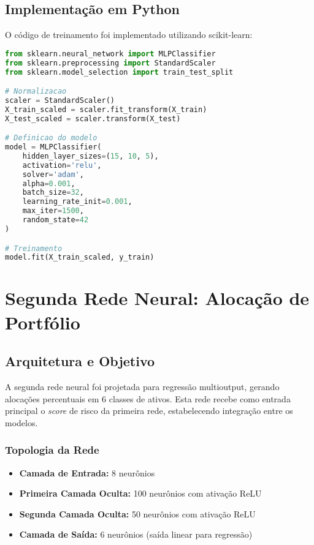 \subsection{Implementação em Python}

O código de treinamento foi implementado utilizando scikit-learn:

\begin{lstlisting}[language=Python, caption=Implementação da primeira rede neural, label=lst:rede1]
from sklearn.neural_network import MLPClassifier
from sklearn.preprocessing import StandardScaler
from sklearn.model_selection import train_test_split

# Normalizacao
scaler = StandardScaler()
X_train_scaled = scaler.fit_transform(X_train)
X_test_scaled = scaler.transform(X_test)

# Definicao do modelo
model = MLPClassifier(
    hidden_layer_sizes=(15, 10, 5),
    activation='relu',
    solver='adam',
    alpha=0.001,
    batch_size=32,
    learning_rate_init=0.001,
    max_iter=1500,
    random_state=42
)

# Treinamento
model.fit(X_train_scaled, y_train)
\end{lstlisting}

\section{Segunda Rede Neural: Alocação de Portfólio}

\subsection{Arquitetura e Objetivo}

A segunda rede neural foi projetada para regressão multioutput, gerando alocações percentuais em 6 classes de ativos. Esta rede recebe como entrada principal o \textit{score} de risco da primeira rede, estabelecendo integração entre os modelos.

\subsubsection{Topologia da Rede}

\begin{itemize}
    \item \textbf{Camada de Entrada:} 8 neurônios
    \item \textbf{Primeira Camada Oculta:} 100 neurônios com ativação ReLU
    \item \textbf{Segunda Camada Oculta:} 50 neurônios com ativação ReLU
    \item \textbf{Camada de Saída:} 6 neurônios (saída linear para regressão)
\end{itemize}

